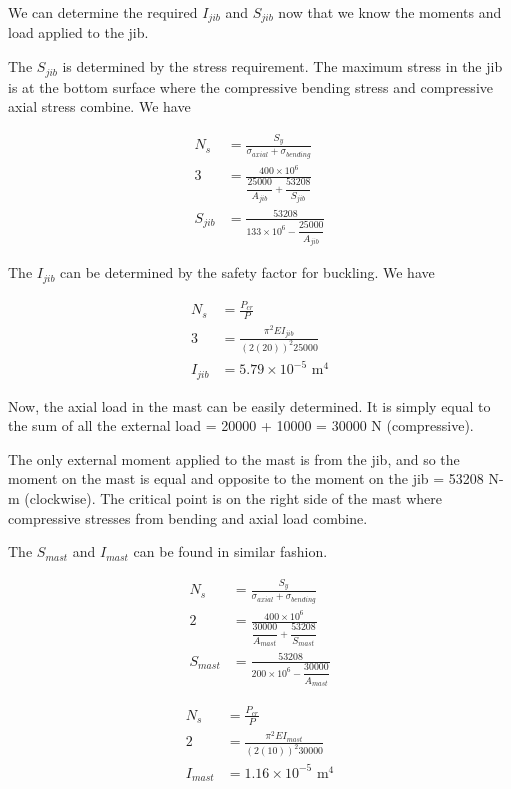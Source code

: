 \documentclass[a4paper,openany,nobib]{tufte-book}
\begin{document}
{{\begin{enumerate}
We can determine the required \(I_{jib}\) and \(S_{jib}\) now that we know
the moments and load applied to the jib.

The \(S_{jib}\) is determined by the stress requirement. The maximum
stress in the jib is at the bottom surface where the compressive bending
stress and compressive axial stress combine. We have

$$\begin{aligned}
    N_s &= \frac{S_y}{\sigma_{axial} + \sigma_{bending}} \\
    3 &= \frac{400 \times 10^6}{\dfrac{25000}{A_{jib}} + \dfrac{53208}{S_{jib}}} \\[1ex]
    S_{jib} &= \frac{53208}{133 \times 10^6 - \dfrac{25000}{A_{jib}}}
  \end{aligned}$$

The \(I_{jib}\) can be determined by the safety factor for buckling. We
have

$$\begin{aligned}
    N_s &= \frac{P_{cr}}{P} \\
    3 &= \frac{ \pi^2 E I_{jib} }{ (2(20))^2 25000 } \\
    I_{jib} &= 5.79 \times 10^{-5} \text{ m}^4
  \end{aligned}$$

Now, the axial load in the mast can be easily determined. It is simply
equal to the sum of all the external load = 20000 + 10000 = 30000 N
(compressive).

The only external moment applied to the mast is from the jib, and so the
moment on the mast is equal and opposite to the moment on the jib =
53208 N-m (clockwise). The critical point is on the right side of the
mast where compressive stresses from bending and axial load combine.

The \(S_{mast}\) and \(I_{mast}\) can be found in similar fashion.

$$\begin{aligned}
    N_s &= \frac{S_y}{\sigma_{axial} + \sigma_{bending}} \\
    2 &= \frac{400 \times 10^6}{\dfrac{30000}{A_{mast}} + \dfrac{53208}{S_{mast}}} \\
    S_{mast} &= \frac{53208}{200 \times 10^6 - \dfrac{30000}{A_{mast}}} 
  \end{aligned}$$

$$\begin{aligned}
    N_s &= \frac{P_{cr}}{P} \\
    2 &= \frac{ \pi^2 E I_{mast} }{ (2(10))^2 30000 } \\
    I_{mast} &= 1.16 \times 10^{-5} \text{ m}^4
  \end{aligned}$$


\end{enumerate}}}
\end{document}
